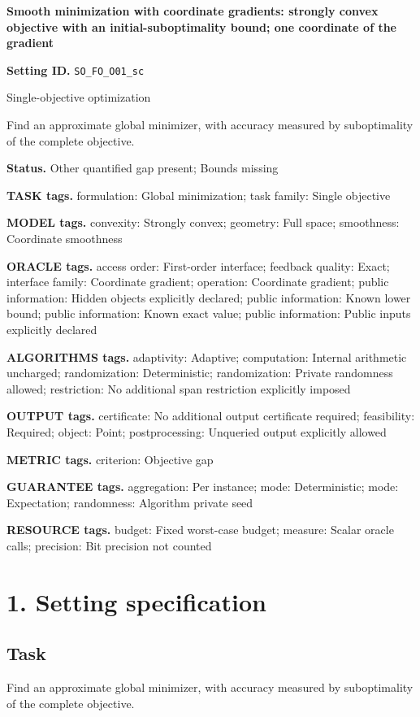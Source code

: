 \documentclass[10pt,a4paper]{article}
\begin{document}
\raggedright

{\LARGE\bfseries\sffamily\color{AtlasNavy} Smooth minimization with coordinate gradients: strongly convex objective with an initial-suboptimality bound; one coordinate of the gradient\par}\vspace{5pt}
\textbf{Setting ID.} \texttt{SO\_\allowbreak{}FO\_\allowbreak{}O01\_\allowbreak{}sc}

Single-objective optimization

Find an approximate global minimizer, with accuracy measured by suboptimality of the complete objective.

\textbf{Status.} Other quantified gap present; Bounds missing

\textbf{TASK tags.} formulation: Global minimization; task family: Single objective

\textbf{MODEL tags.} convexity: Strongly convex; geometry: Full space; smoothness: Coordinate smoothness

\textbf{ORACLE tags.} access order: First-order interface; feedback quality: Exact; interface family: Coordinate gradient; operation: Coordinate gradient; public information: Hidden objects explicitly declared; public information: Known lower bound; public information: Known exact value; public information: Public inputs explicitly declared

\textbf{ALGORITHMS tags.} adaptivity: Adaptive; computation: Internal arithmetic uncharged; randomization: Deterministic; randomization: Private randomness allowed; restriction: No additional span restriction explicitly imposed

\textbf{OUTPUT tags.} certificate: No additional output certificate required; feasibility: Required; object: Point; postprocessing: Unqueried output explicitly allowed

\textbf{METRIC tags.} criterion: Objective gap

\textbf{GUARANTEE tags.} aggregation: Per instance; mode: Deterministic; mode: Expectation; randomness: Algorithm private seed

\textbf{RESOURCE tags.} budget: Fixed worst-case budget; measure: Scalar oracle calls; precision: Bit precision not counted

\section{1. Setting specification}
\subsection{Task}
Find an approximate global minimizer, with accuracy measured by suboptimality of the complete objective.
\end{document}
